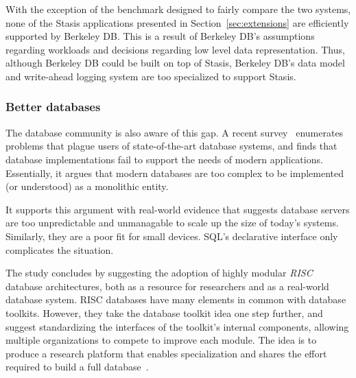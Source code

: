 \documentclass[letterpaper,twocolumn,10pt]{article}
\newcommand{\yad}{Stasis\xspace}
\begin{document}
With the
exception of the benchmark designed to fairly compare the two systems, none of the \yad 
applications presented in Section~\ref{sec:extensions} are efficiently
supported by Berkeley DB.   This is a result of Berkeley DB's  
assumptions regarding workloads and decisions regarding low level data
representation.  Thus, although Berkeley DB could be built on top of \yad,
Berkeley DB's data model and write-ahead logging system are too specialized to support \yad.


\subsubsection{Better databases}

The database community is also aware of this gap. 
A recent survey~\cite{riscDB} enumerates problems that plague users of
state-of-the-art database systems, and finds that database implementations fail to support the
needs of modern applications.  Essentially, it argues that modern 
databases are too complex to be implemented (or understood) 
as a monolithic entity.

It supports this argument with real-world evidence that suggests
database servers are too unpredictable and unmanagable to
scale up the size of today's systems.  Similarly, they are a poor fit
for small devices.  SQL's declarative interface only complicates the
situation.


The study concludes 
by suggesting the adoption of highly modular {\em RISC} database architectures, both as a resource for researchers and as a 
real-world database system.  
RISC databases have many elements in common with
database toolkits.  However, they take the database toolkit idea one
step further, and suggest standardizing the interfaces of the
toolkit's internal components, allowing multiple organizations to
compete to improve each module.  The idea is to produce a research
platform that enables specialization and shares the effort required to build a full database~\cite{riscDB}.
\end{document}
